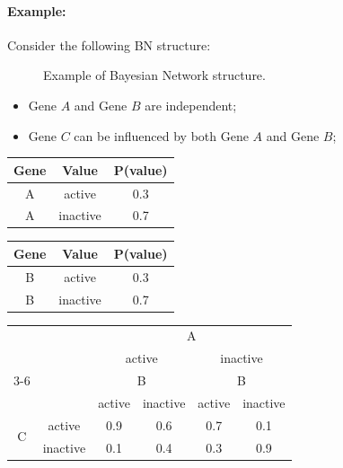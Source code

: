 \paragraph{Example:}
Consider the following BN structure:
\begin{figure}[H]
\centering
    \caption{Example of Bayesian Network structure.}
\end{figure}
\begin{itemize}
    \item Gene $A$ and Gene $B$ are independent;
    \item Gene $C$ can be influenced by both Gene $A$ and Gene $B$;
\end{itemize}
\begin{center}
    \begin{minipage}{0.4\textwidth}
        \centering
        \begin{tabular}{c|c|c}
            Gene &  Value & P(value)\\ 
            \hline
            A & active   & 0.3\\
            A & inactive & 0.7\\
        \end{tabular}
        \label{tab:cpdGeneA}
    \end{minipage}
    \hfill
    \begin{minipage}{0.4\textwidth}
    \centering
        \begin{tabular}{c|c|c}
            Gene &  Value & P(value)\\ 
            \hline
            B & active   & 0.3\\
            B & inactive & 0.7\\
        \end{tabular}
        \label{tab:cpdGeneB}
    \end{minipage}
\end{center}

\begin{center}
\begin{tabular}{|c|c|cc|cc|}
\hline
 & & \multicolumn{4}{c|}{A} \\
 & & \multicolumn{2}{c|}{active} & \multicolumn{2}{c|}{inactive} \\
\cline{3-6}
 & & \multicolumn{2}{c|}{B} & \multicolumn{2}{c|}{B} \\
 & & active & inactive & active & inactive \\
\hline
\multirow{2}{*}{C}
 & active   & 0.9 & 0.6 & 0.7 & 0.1 \\
 & inactive & 0.1 & 0.4 & 0.3 & 0.9 \\
\hline
\end{tabular}
\end{center}

